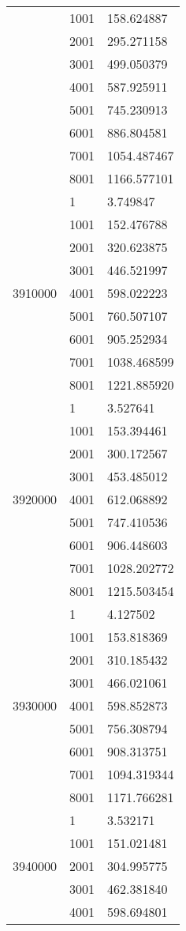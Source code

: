 \begin{table}[htb!]
\begin{tabular}{lll}
 & 1001 & 158.624887 \\
 & 2001 & 295.271158 \\
 & 3001 & 499.050379 \\
 & 4001 & 587.925911 \\
 & 5001 & 745.230913 \\
 & 6001 & 886.804581 \\
 & 7001 & 1054.487467 \\
 & 8001 & 1166.577101 \\
\multirow[c]{9}{*}{3910000} & 1 & 3.749847 \\
 & 1001 & 152.476788 \\
 & 2001 & 320.623875 \\
 & 3001 & 446.521997 \\
 & 4001 & 598.022223 \\
 & 5001 & 760.507107 \\
 & 6001 & 905.252934 \\
 & 7001 & 1038.468599 \\
 & 8001 & 1221.885920 \\
\multirow[c]{9}{*}{3920000} & 1 & 3.527641 \\
 & 1001 & 153.394461 \\
 & 2001 & 300.172567 \\
 & 3001 & 453.485012 \\
 & 4001 & 612.068892 \\
 & 5001 & 747.410536 \\
 & 6001 & 906.448603 \\
 & 7001 & 1028.202772 \\
 & 8001 & 1215.503454 \\
\multirow[c]{9}{*}{3930000} & 1 & 4.127502 \\
 & 1001 & 153.818369 \\
 & 2001 & 310.185432 \\
 & 3001 & 466.021061 \\
 & 4001 & 598.852873 \\
 & 5001 & 756.308794 \\
 & 6001 & 908.313751 \\
 & 7001 & 1094.319344 \\
 & 8001 & 1171.766281 \\
\multirow[c]{9}{*}{3940000} & 1 & 3.532171 \\
 & 1001 & 151.021481 \\
 & 2001 & 304.995775 \\
 & 3001 & 462.381840 \\
 & 4001 & 598.694801 \\

\end{tabular}
\end{table}
